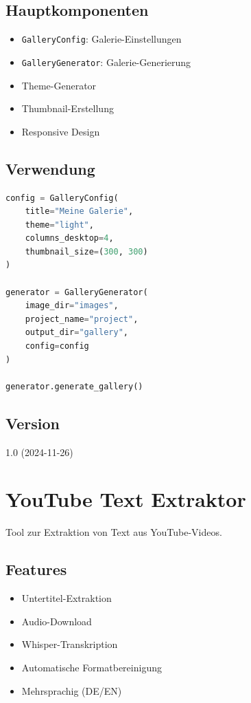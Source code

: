 \documentclass{content/vorlage-design-main}
\begin{document}
\subsection{Hauptkomponenten}\label{hauptkomponenten}

\begin{itemize}

\item
  \verb|GalleryConfig|: Galerie-Einstellungen
\item
  \verb|GalleryGenerator|: Galerie-Generierung
\item
  Theme-Generator
\item
  Thumbnail-Erstellung
\item
  Responsive Design
\end{itemize}

\subsection{Verwendung}\label{verwendung-5}

\begin{lstlisting}[language=Python]
config = GalleryConfig(
    title="Meine Galerie",
    theme="light",
    columns_desktop=4,
    thumbnail_size=(300, 300)
)

generator = GalleryGenerator(
    image_dir="images",
    project_name="project",
    output_dir="gallery",
    config=config
)

generator.generate_gallery()
\end{lstlisting}

\subsection{Version}\label{version-4}

1.0 (2024-11-26)

\section{YouTube Text Extraktor}\label{youtube-text-extraktor}

Tool zur Extraktion von Text aus YouTube-Videos.

\subsection{Features}\label{features-5}

\begin{itemize}

\item
  Untertitel-Extraktion
\item
  Audio-Download
\item
  Whisper-Transkription
\item
  Automatische Formatbereinigung
\item
  Mehrsprachig (DE/EN)
\end{itemize}
\end{document}
